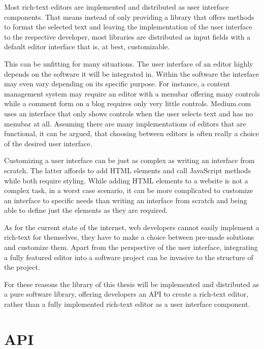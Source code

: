 Most rich-text editors are implemented and distributed as user interface components. That means instead of only providing a library that offers methods to format the selected text and leaving the implementation of the user interface to the respective developer, most libraries are distributed as input fields with a default editor interface that is, at best, customizable.

This can be unfitting for many situations. The user interface of an editor highly depends on the software it will be integrated in. Within the software the interface may even vary depending on its specific purpose. For instance, a content management system may require an editor with a menubar offering many controls while a comment form on a blog requires only very little controls. Medium.com uses an interface that only shows controls when the user selects text and has no menubar at all. Assuming there are many implementations of editors that are functional, it can be argued, that choosing between editors is often really a choice of the desired user interface.

Customizing a user interface can be just as complex as writing an interface from scratch. The latter affords to add HTML elements and call JavaScript methods while both require styling. While adding HTML elements to a website is not a complex task, in a worst case scenario, it can be more complicated to customize an interface to specific needs than writing an interface from scratch and being able to define just the elements as they are required. 

As for the current state of the internet, web developers cannot easily implement a rich-text for themselves, they have to make a choice between pre-made solutions and customize them. Apart from the perspective of the user interface, integrating a fully featured editor into a software project can be invasive to the structure of the project.

For these reasons the library of this thesis will be implemented and distributed as a pure software library, offering developers an API to create a rich-text editor, rather than a fully implemented rich-text editor as a user interface component. 



\section{API}
\label{sec:api_design}
\label{sec:las_before_software_architecture}

